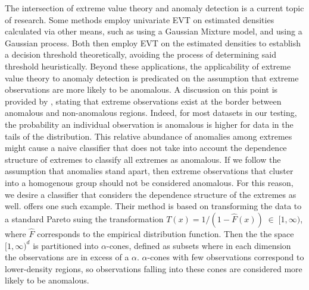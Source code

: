 The intersection of extreme value theory and anomaly detection is a current 
    topic of research.  Some methods employ univariate EVT on estimated 
    densities calculated via other means, such as \cite{clifton2011} using a 
    Gaussian Mixture model, and \cite{gu2021} using a Gaussian process.  Both 
    then employ EVT on the estimated densities to establish a decision 
    threshold theoretically, avoiding the process of determining said
    threshold heuristically.  Beyond these applications,
    the applicability of extreme value theory to anomaly detection is predicated on 
    the assumption that extreme observations are more likely to be anomalous.  
    A discussion on this point is provided by \cite{goix2017}, stating that 
    extreme observations exist at the border between anomalous and non-anomalous 
    regions.  Indeed, for most datasets in our testing, the probability an 
    individual observation is anomalous is higher for data in the tails of the 
    distribution. This relative abundance of anomalies among extremes might 
    cause a naive classifier that does not take into account the dependence 
    structure of extremes to classify all extremes as anomalous.  If we follow 
    the assumption that anomalies stand apart, then extreme observations that 
    cluster into a homogenous group should not be considered anomalous.  For 
    this reason, we desire a classifier that considers the dependence structure 
    of the extremes as well.
    \cite{goix2017} offers one such example.
    Their method is based on transforming the data to a standard 
    Pareto suing the transformation  $T(x) = 1/(1 - \hat{F}(x))\;\in\;[1,\infty)$, 
    where $\hat{F}$ corresponds  to the empirical distribution function. Then the 
    the space $[1,\infty)^d$ is partitioned into $\alpha$-cones, defined as 
    subsets where in each dimension the observations are in excess of a $\alpha$.
    $\alpha$-cones with few observations correspond to lower-density regions, so 
    observations falling into these cones are considered more likely to be anomalous.

